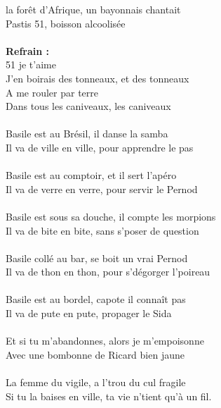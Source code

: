
 la forêt d'Afrique, un bayonnais chantait
\\Pastis 51, boisson alcoolisée
\\\\\textbf{Refrain :}
\\51 je t'aime
\\J'en boirais des tonneaux, et des tonneaux
\\A me rouler par terre
\\Dans tous les caniveaux, les caniveaux
\\\\Basile est au Brésil, il danse la samba
\\Il va de ville en ville, pour apprendre le pas
\\\\Basile est au comptoir, et il sert l'apéro
\\Il va de verre en verre, pour servir le Pernod
\\\\Basile est sous sa douche, il compte les morpions
\\Il va de bite en bite, sans s'poser de question
\\\\Basile collé au bar, se boit un vrai Pernod
\\Il va de thon en thon, pour s'dégorger l'poireau
\\\\Basile est au bordel, capote il connaît pas
\\Il va de pute en pute, propager le Sida
\\\\Et si tu m'abandonnes, alors je m'empoisonne
\\Avec une bombonne de Ricard bien jaune
\\\\La femme du vigile, a l'trou du cul fragile
\\Si tu la baises en ville, ta vie n'tient qu'à un fil.

\breakpage